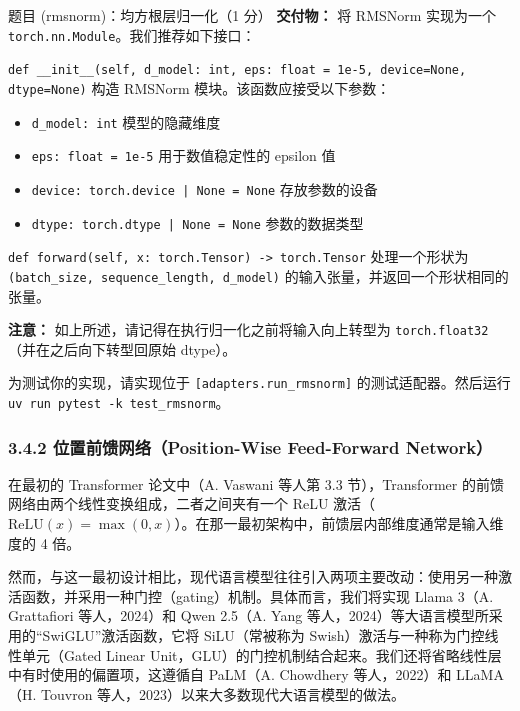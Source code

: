 \begin{problembox}{题目 (rmsnorm)：均方根层归一化（1 分）}
\textbf{交付物：} 将 RMSNorm 实现为一个 \texttt{torch.nn.Module}。我们推荐如下接口：

\medskip
\texttt{def \_\_init\_\_(self, d\_model: int, eps: float = 1e-5, device=None, dtype=None)} \quad 构造 RMSNorm 模块。该函数应接受以下参数：
\begin{itemize}[leftmargin=2.2em]
  \item \texttt{d\_model: int} \quad 模型的隐藏维度
  \item \texttt{eps: float = 1e-5} \quad 用于数值稳定性的 epsilon 值
  \item \texttt{device: torch.device | None = None} \quad 存放参数的设备
  \item \texttt{dtype: torch.dtype | None = None} \quad 参数的数据类型
\end{itemize}

\texttt{def forward(self, x: torch.Tensor) -> torch.Tensor} \quad 处理一个形状为 \texttt{(batch\_size, sequence\_length, d\_model)} 的输入张量，并返回一个形状相同的张量。

\medskip
\textbf{注意：} 如上所述，请记得在执行归一化之前将输入向上转型为 \texttt{torch.float32}（并在之后向下转型回原始 dtype）。

为测试你的实现，请实现位于 \texttt{[adapters.run\_rmsnorm]} 的测试适配器。然后运行 \texttt{uv run pytest -k test\_rmsnorm}。
\end{problembox}


\subsubsection*{3.4.2 位置前馈网络（Position-Wise Feed-Forward Network）}

\begin{center}
\end{center}

在最初的 Transformer 论文中（A. Vaswani 等人第 3.3 节），Transformer 的前馈网络由两个线性变换组成，二者之间夹有一个 ReLU 激活（$\mathrm{ReLU}(x) = \max(0, x)$）。在那一最初架构中，前馈层内部维度通常是输入维度的 4 倍。

然而，与这一最初设计相比，现代语言模型往往引入两项主要改动：使用另一种激活函数，并采用一种门控（gating）机制。具体而言，我们将实现 Llama 3（A. Grattafiori 等人，2024）和 Qwen 2.5（A. Yang 等人，2024）等大语言模型所采用的“SwiGLU”激活函数，它将 SiLU（常被称为 Swish）激活与一种称为门控线性单元（Gated Linear Unit，GLU）的门控机制结合起来。我们还将省略线性层中有时使用的偏置项，这遵循自 PaLM（A. Chowdhery 等人，2022）和 LLaMA（H. Touvron 等人，2023）以来大多数现代大语言模型的做法。

